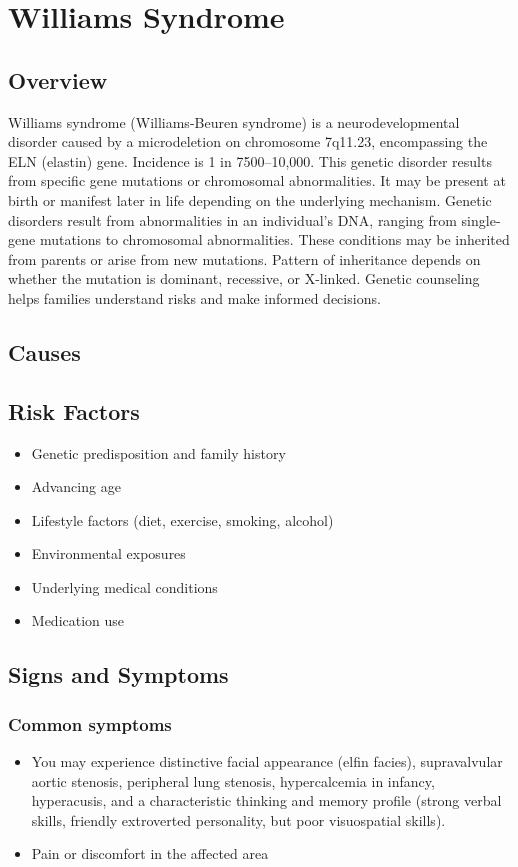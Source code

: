 \chapter{Williams Syndrome}
\label{sec:Williams Syndrome}

\section{Overview}
Williams syndrome (Williams-Beuren syndrome) is a neurodevelopmental disorder caused by a microdeletion on chromosome 7q11.23, encompassing the ELN (elastin) gene. Incidence is 1 in 7500--10,000. This genetic disorder results from specific gene mutations or chromosomal abnormalities. It may be present at birth or manifest later in life depending on the underlying mechanism. Genetic disorders result from abnormalities in an individual's DNA, ranging from single-gene mutations to chromosomal abnormalities. These conditions may be inherited from parents or arise from new mutations. Pattern of inheritance depends on whether the mutation is dominant, recessive, or X-linked. Genetic counseling helps families understand risks and make informed decisions.
\section{Causes}
\section{Risk Factors}

\begin{itemize}[noitemsep]
  \item Genetic predisposition and family history
  \item Advancing age
  \item Lifestyle factors (diet, exercise, smoking, alcohol)
  \item Environmental exposures
  \item Underlying medical conditions
  \item Medication use
\end{itemize}
\section{Signs and Symptoms}

\subsection{Common symptoms}
\begin{itemize}[noitemsep]
  \item You may experience distinctive facial appearance (elfin facies), supravalvular aortic stenosis, peripheral lung stenosis, hypercalcemia in infancy, hyperacusis, and a characteristic thinking and memory profile (strong verbal skills, friendly extroverted personality, but poor visuospatial skills).

  \item Pain or discomfort in the affected area
  \end{itemize}

